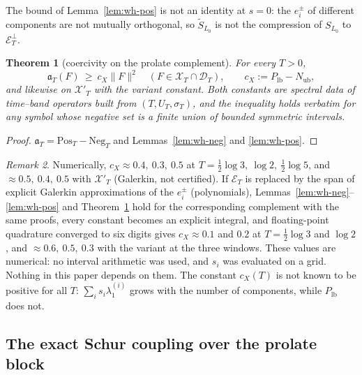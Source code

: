 \documentclass[11pt]{amsart}
\newtheorem{theorem}{Theorem}[section]
\theoremstyle{definition}
\theoremstyle{remark}
\newtheorem{remark}[theorem]{Remark}
\newcommand{\sT}{\sigma_T}
\begin{document}
The bound of Lemma~\ref{lem:wh-pos} is not an identity at $s=0$: the $e^\pm_i$ of different components are not
mutually orthogonal, so $\widetilde S_{L_0}$ is not the compression of $S_{L_0}$ to $\mathcal E_T^\perp$.

\begin{theorem}[coercivity on the prolate complement]\label{thm:wh-LW}
For every $T>0$,
\[
\mathfrak a_T(F)\ \ge\ c_X\|F\|^2\quad(F\in\mathcal X_T\cap\mathcal D_T),\qquad c_X:=P_{\mathrm{lb}}-N_{\mathrm{ub}},
\]
and likewise on $\mathcal X'_T$ with the variant constant. Both constants are spectral data of time--band
operators built from $(T,U_T,\sT)$, and the inequality holds verbatim for any symbol whose negative set is a
finite union of bounded symmetric intervals.
\end{theorem}

\begin{proof}
$\mathfrak a_T=\mathrm{Pos}_T-\mathrm{Neg}_T$ and Lemmas~\ref{lem:wh-neg} and \ref{lem:wh-pos}.
\end{proof}

\begin{remark}\label{rem:wh-LWnum}
Numerically, $c_X\approx0.4,\ 0.3,\ 0.5$ at $T=\frac12\log3,\ \log2,\ \frac12\log5$, and $\approx0.5,\ 0.4,\ 0.5$
with $\mathcal X'_T$ (Galerkin, not certified). If $\mathcal E_T$ is replaced by the span of explicit Galerkin
approximations of the $e^\pm_i$ (polynomials), Lemmas~\ref{lem:wh-neg}--\ref{lem:wh-pos} and
Theorem~\ref{thm:wh-LW} hold for the corresponding complement with the same proofs, every constant becomes an
explicit integral, and floating-point quadrature converged to six digits gives $c_X\approx0.1$ and $0.2$ at
$T=\frac12\log3$ and $\log2$, and $\approx0.6,\ 0.5,\ 0.3$ with the variant at the three windows. These values
are numerical: no interval arithmetic was used, and $s_i$ was evaluated on a grid. Nothing in this paper
depends on them. The constant $c_X(T)$ is not known to be positive for all $T$: $\sum_is_i\lambda^{(i)}_1$ grows
with the number of components, while $P_{\mathrm{lb}}$ does not.
\end{remark}

\subsection{The exact Schur coupling over the prolate block}\label{subsec:wh-schur}
\end{document}
